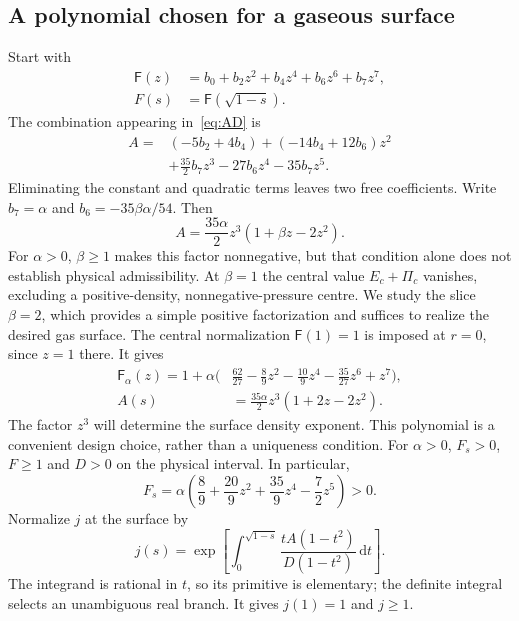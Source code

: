 \documentclass[aps,prd,reprint,a4paper,nofootinbib,floatfix]{revtex4-2}
\newcommand{\dd}{\mathrm d}
\begin{document}
\subsection{A polynomial chosen for a gaseous surface}
Start with
\begin{align}
 \mathsf F(z)&=b_0+b_2z^2+b_4z^4+b_6z^6+b_7z^7,\nonumber\\
 F(s)&=\mathsf F(\sqrt{1-s}).
\end{align}
The combination appearing in~\eqref{eq:AD} is
\begin{align}
 A={}&(-5b_2+4b_4)+(-14b_4+12b_6)z^2\nonumber\\
 &+\frac{35}{2}b_7z^3-27b_6z^4-35b_7z^5.
\end{align}
Eliminating the constant and quadratic terms leaves two free coefficients. Write $b_7=\alpha$ and $b_6=-35\beta\alpha/54$. Then
\begin{equation}
 A=\frac{35\alpha}{2}z^3(1+\beta z-2z^2).
\end{equation}
For $\alpha>0$, $\beta\ge1$ makes this factor nonnegative, but that condition alone does not establish physical admissibility. At $\beta=1$ the central value $E_c+\Pi_c$ vanishes, excluding a positive-density, nonnegative-pressure centre. We study the slice $\beta=2$, which provides a simple positive factorization and suffices to realize the desired gas surface. The central normalization $\mathsf F(1)=1$ is imposed at $r=0$, since $z=1$ there. It gives
\begin{align}
 \mathsf F_\alpha(z)=1+\alpha\biggl(&\frac{62}{27}-\frac89z^2-\frac{10}{9}z^4
                  -\frac{35}{27}z^6+z^7\biggr),\label{eq:F}\\
 A(s)&=\frac{35\alpha}{2}z^3(1+2z-2z^2).\label{eq:A}
\end{align}
The factor $z^3$ will determine the surface density exponent. This polynomial is a convenient design choice, rather than a uniqueness condition. For $\alpha>0$, $F_s>0$, $F\ge1$ and $D>0$ on the physical interval. In particular,
\begin{equation}
 F_s=\alpha\left(\frac89+\frac{20}{9}z^2+\frac{35}{9}z^4-\frac72z^5\right)>0.
\end{equation}
Normalize $j$ at the surface by
\begin{equation}
 j(s)=\exp\left[\int_0^{\sqrt{1-s}}
       \frac{tA(1-t^2)}{D(1-t^2)}\,\dd t\right].
 \label{eq:j}
\end{equation}
The integrand is rational in $t$, so its primitive is elementary; the definite integral selects an unambiguous real branch. It gives $j(1)=1$ and $j\ge1$.
\end{document}
